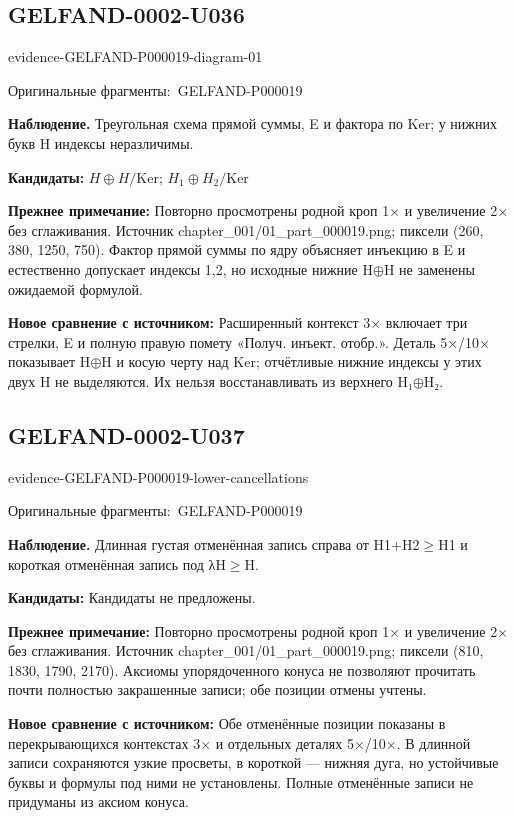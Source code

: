 \documentclass[11pt]{article}
\newcommand{\EvidenceBlock}[4]{%
 \par\smallskip\noindent\begin{minipage}{\linewidth}
 \begin{minipage}[t]{.47\linewidth}\vspace{0pt}\centering
 \csname evidence-#1-#2\endcsname\par
 {\scriptsize\SourceCropCaption\ #1}\par
 \end{minipage}\hfill
 \begin{minipage}[t]{.49\linewidth}\vspace{0pt}\raggedright
 {\small\color{orange!65!black}\textbf{#4} #3}\par
 \end{minipage}
 \end{minipage}\par\smallskip}
\newcommand{\SourceCropCaption}{Оригинальные фрагменты:}\newcommand{\ReadingCaption}{Сомнительное чтение.}\newcommand{\IncompleteCaption}{Неразобранный фрагмент.}\newcommand{\DiagramCaption}{Рисунок и набранное описание.}
\begin{document}
\subsection*{GELFAND-0002-U036}
\EvidenceBlock{GELFAND-P000019}{diagram-01}{Треугольная схема прямой суммы, E и фактора по Ker; у нижних букв H индексы неразличимы.}{Наблюдение.}
\par\smallskip\noindent\textbf{Кандидаты: } \(H\oplus H/\mathrm{Ker}\); \(H_1\oplus H_2/\mathrm{Ker}\)\par
\par\smallskip\noindent\textbf{Прежнее примечание: } Повторно просмотрены родной кроп 1× и увеличение 2× без сглаживания. Источник chapter\_001/01\_part\_000019.png; пиксели (260, 380, 1250, 750). Фактор прямой суммы по ядру объясняет инъекцию в E и естественно допускает индексы 1,2, но исходные нижние H\(\oplus\)H не заменены ожидаемой формулой.\par
\par\smallskip\noindent\textbf{Новое сравнение с источником: } Расширенный контекст 3× включает три стрелки, E и полную правую помету «Получ. инъект. отобр.». Деталь 5×/10× показывает H\(\oplus\)H и косую черту над Ker; отчётливые нижние индексы у этих двух H не выделяются. Их нельзя восстанавливать из верхнего H₁\(\oplus\)H₂.\par

\subsection*{GELFAND-0002-U037}
\EvidenceBlock{GELFAND-P000019}{lower-cancellations}{Длинная густая отменённая запись справа от H1+H2\(\ge\)H1 и короткая отменённая запись под λH\(\ge\)H.}{Наблюдение.}
\par\smallskip\noindent\textbf{Кандидаты: } Кандидаты не предложены.\par
\par\smallskip\noindent\textbf{Прежнее примечание: } Повторно просмотрены родной кроп 1× и увеличение 2× без сглаживания. Источник chapter\_001/01\_part\_000019.png; пиксели (810, 1830, 1790, 2170). Аксиомы упорядоченного конуса не позволяют прочитать почти полностью закрашенные записи; обе позиции отмены учтены.\par
\par\smallskip\noindent\textbf{Новое сравнение с источником: } Обе отменённые позиции показаны в перекрывающихся контекстах 3× и отдельных деталях 5×/10×. В длинной записи сохраняются узкие просветы, в короткой — нижняя дуга, но устойчивые буквы и формулы под ними не установлены. Полные отменённые записи не придуманы из аксиом конуса.\par
\end{document}
